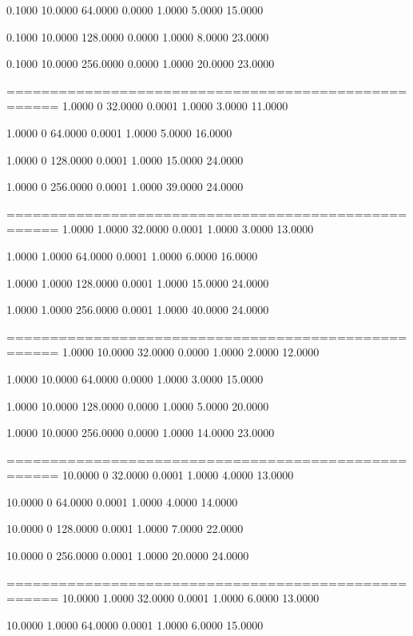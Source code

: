     0.1000   10.0000   64.0000    0.0000    1.0000    5.0000   15.0000

    0.1000   10.0000  128.0000    0.0000    1.0000    8.0000   23.0000

    0.1000   10.0000  256.0000    0.0000    1.0000   20.0000   23.0000

====================================================
    1.0000         0   32.0000    0.0001    1.0000    3.0000   11.0000

    1.0000         0   64.0000    0.0001    1.0000    5.0000   16.0000

    1.0000         0  128.0000    0.0001    1.0000   15.0000   24.0000

    1.0000         0  256.0000    0.0001    1.0000   39.0000   24.0000

====================================================
    1.0000    1.0000   32.0000    0.0001    1.0000    3.0000   13.0000

    1.0000    1.0000   64.0000    0.0001    1.0000    6.0000   16.0000

    1.0000    1.0000  128.0000    0.0001    1.0000   15.0000   24.0000

    1.0000    1.0000  256.0000    0.0001    1.0000   40.0000   24.0000

====================================================
    1.0000   10.0000   32.0000    0.0000    1.0000    2.0000   12.0000

    1.0000   10.0000   64.0000    0.0000    1.0000    3.0000   15.0000

    1.0000   10.0000  128.0000    0.0000    1.0000    5.0000   20.0000

    1.0000   10.0000  256.0000    0.0000    1.0000   14.0000   23.0000

====================================================
   10.0000         0   32.0000    0.0001    1.0000    4.0000   13.0000

   10.0000         0   64.0000    0.0001    1.0000    4.0000   14.0000

   10.0000         0  128.0000    0.0001    1.0000    7.0000   22.0000

   10.0000         0  256.0000    0.0001    1.0000   20.0000   24.0000

====================================================
   10.0000    1.0000   32.0000    0.0001    1.0000    6.0000   13.0000

   10.0000    1.0000   64.0000    0.0001    1.0000    6.0000   15.0000

